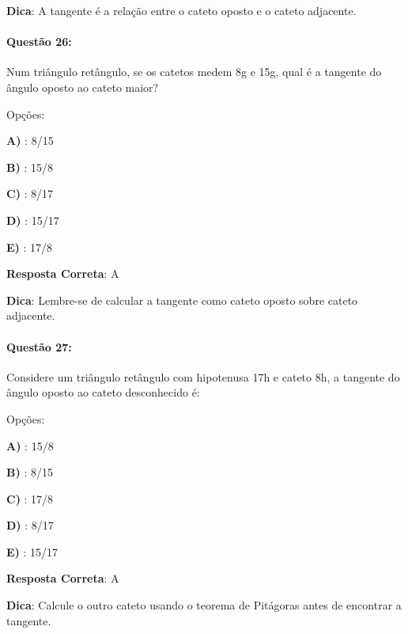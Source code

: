 \documentclass{article}
\begin{document}
\vspace{\baselineskip}\textbf{Dica}: A tangente é a relação entre o cateto oposto e o cateto adjacente.

\paragraph{Questão 26:}
{Num triângulo retângulo, se os catetos medem 8g e 15g, qual é a tangente do ângulo oposto ao cateto maior?}

\vspace{\baselineskip}Opções:

\vspace{\baselineskip}\textbf{A) }: 8/15 

\textbf{B) }: 15/8 

\textbf{C) }: 8/17 

\textbf{D) }: 15/17 

\textbf{E) }: 17/8 

\vspace{\baselineskip}\textbf{Resposta Correta}: A

\vspace{\baselineskip}\textbf{Dica}: Lembre-se de calcular a tangente como cateto oposto sobre cateto adjacente.

\paragraph{Questão 27:}
{Considere um triângulo retângulo com hipotenusa 17h e cateto 8h, a tangente do ângulo 
oposto ao cateto desconhecido é:}

\vspace{\baselineskip}Opções:

\vspace{\baselineskip}\textbf{A) }: 15/8 

\textbf{B) }: 8/15 

\textbf{C) }: 17/8 

\textbf{D) }: 8/17 

\textbf{E) }: 15/17 

\vspace{\baselineskip}\textbf{Resposta Correta}: A

\vspace{\baselineskip}\textbf{Dica}: Calcule o outro cateto usando o teorema de Pitágoras antes de encontrar a tangente.
\end{document}
